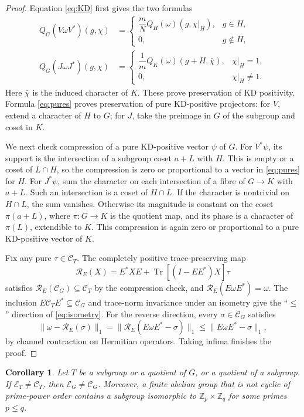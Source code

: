\documentclass[11pt,a4paper]{article}
\newtheorem{corollary}[theorem]{Corollary}
\theoremstyle{definition}
\theoremstyle{plain}
\DeclareMathOperator{\Tr}{Tr}
\newcommand{\Z}{\mathbb Z}
\newcommand{\E}{\mathcal E}
\newcommand{\hull}{\mathcal C}
\begin{document}
\begin{proof}
Equation \eqref{eq:KD} first gives the two formulas
\begin{align}
 Q_G(V\omega V^*)(g,\chi)
 &=\begin{cases}\dfrac mN Q_H(\omega)(g,\chi|_H),&g\in H,\\0,&g\notin H,
 \end{cases}\label{eq:subgroup}\\
 Q_G(J\omega J^*)(g,\chi)
 &=\begin{cases}\dfrac1m Q_K(\omega)(g+H,\bar\chi),&\chi|_H=1,\\0,&\chi|_H\ne1.
 \end{cases}\label{eq:quotient}
\end{align}
Here $\bar\chi$ is the induced character of $K$. These prove preservation
of KD positivity. Formula \eqref{eq:pures} proves preservation of pure
KD-positive projectors: for $V$, extend a character of $H$ to $G$; for
$J$, take the preimage in $G$ of the subgroup and coset in $K$.

We next check compression of a pure KD-positive vector $\psi$ of $G$.
For $V^*\psi$, its support is the intersection of a subgroup coset
$a+L$ with $H$. This is empty or a coset of $L\cap H$, so the compression
is zero or proportional to a vector in \eqref{eq:pures} for $H$.
For $J^*\psi$, sum the character on each intersection of a fibre of
$G\to K$ with $a+L$. Such an intersection is a coset of $H\cap L$.
If the character is nontrivial on $H\cap L$, the sum vanishes.
Otherwise its magnitude is constant on the coset $\pi(a+L)$, where
$\pi:G\to K$ is the quotient map, and its phase is a character of $\pi(L)$,
extendible to $K$. This compression is again zero or proportional to a pure
KD-positive vector of $K$.

Fix any pure $\tau\in\hull_T$. The completely positive trace-preserving map
\[
 \mathcal R_E(X)=E^*XE+\Tr[(I-EE^*)X]\tau
\]
satisfies $\mathcal R_E(\hull_G)\subseteq\hull_T$ by the compression check,
and $\mathcal R_E(E\omega E^*)=\omega$. The inclusion
$E\hull_TE^*\subseteq\hull_G$ and trace-norm invariance under an isometry
give the ``$\leq$'' direction of \eqref{eq:isometry}. For the reverse
direction, every $\sigma\in\hull_G$ satisfies
\[
 \|\omega-\mathcal R_E(\sigma)\|_1
 =\|\mathcal R_E(E\omega E^*-\sigma)\|_1
 \leq\|E\omega E^*-\sigma\|_1,
\]
by channel contraction on Hermitian operators. Taking infima finishes
the proof.
\end{proof}

\begin{corollary}\label{cor:reduction}
Let $T$ be a subgroup or a quotient of $G$, or a quotient of a subgroup. If
$\E_T\neq\hull_T$, then $\E_G\neq\hull_G$. Moreover, a finite abelian group
that is not cyclic of prime-power order contains a subgroup isomorphic to
$\Z_p\times\Z_q$ for some primes $p\leq q$.
\end{corollary}
\end{document}
